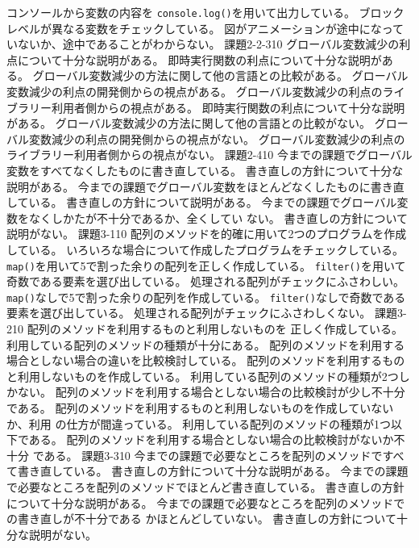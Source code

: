 \documentclass[a4j]{jreport}
\begin{document}
{{}
{
  {コンソールから変数の内容を
  \texttt{console.log()}を用いて出力している。}
  {ブロックレベルが異なる変数をチェックしている。}
  {図がアニメーションが途中になっていないか、途中であることがわからない。}
}
{\ResultEFI}
{課題2-2-3}{10}
{
  {グローバル変数減少の利点について十分な説明がある。}
  {即時実行関数の利点について十分な説明がある。}
  {グローバル変数減少の方法に関して他の言語との比較がある。}
}
{
  {グローバル変数減少の利点の開発側からの視点がある。}
  {グローバル変数減少の利点のライブラリー利用者側からの視点がある。}
  {即時実行関数の利点について十分な説明がある。}
  {グローバル変数減少の方法に関して他の言語との比較がない。}
}
{
  {グローバル変数減少の利点の開発側からの視点がない。}
  {グローバル変数減少の利点のライブラリー利用者側からの視点がない。}
}
{\ResultEI}
{課題2-4}{10}
{
  {今までの課題でグローバル変数をすべてなくしたものに書き直している。}
  {書き直しの方針について十分な説明がある。}
}
{
  {今までの課題でグローバル変数をほとんどなくしたものに書き直している。}
  {書き直しの方針について説明がある。}
}
{
  {今までの課題でグローバル変数をなくしかたが不十分であるか、全くしてい
  ない。}
  {書き直しの方針について説明がない。}
}
{\ResultA}
{課題3-1}{10}
{
  {配列のメソッドを的確に用いて2つのプログラムを作成している。}
  {いろいろな場合について作成したプログラムをチェックしている。}
}
{
  {\texttt{map()}を用いて5で割った余りの配列を正しく作成している。}
  {\texttt{filter()}を用いて奇数である要素を選び出している。}
  {処理される配列がチェックにふさわしい。}
}
{
  {\texttt{map()}なしで5で割った余りの配列を作成している。}
  {\texttt{filter()}なしで奇数である要素を選び出している。}
  {処理される配列がチェックにふさわしくない。}
}
{\ResultEI}
{課題3-2}{10}
{
  {配列のメソッドを利用するものと利用しないものを
	正しく作成している。}
  {利用している配列のメソッドの種類が十分にある。}
  {配列のメソッドを利用する場合としない場合の違いを比較検討している。}
}
{
  {配列のメソッドを利用するものと利用しないものを作成している。}
  {利用している配列のメソッドの種類が2つしかない。}
  {配列のメソッドを利用する場合としない場合の比較検討が少し不十分
  である。}
}
{
  {配列のメソッドを利用するものと利用しないものを作成していないか、利用
  の仕方が間違っている。}
  {利用している配列のメソッドの種類が1つ以下である。}
  {配列のメソッドを利用する場合としない場合の比較検討がないか不十分
  である。}
}
{\ResultEI}
{課題3-3}{10}
{
  {今までの課題で必要なところを配列のメソッドですべて書き直している。}
  {書き直しの方針について十分な説明がある。}
}
{
  {今までの課題で必要なところを配列のメソッドでほとんど書き直している。}
  {書き直しの方針について十分な説明がある。}
}
{
  {今までの課題で必要なところを配列のメソッドでの書き直しが不十分である
  かほとんどしていない。}
  {書き直しの方針について十分な説明がない。}
}
{\ResultA}
}
\end{document}
